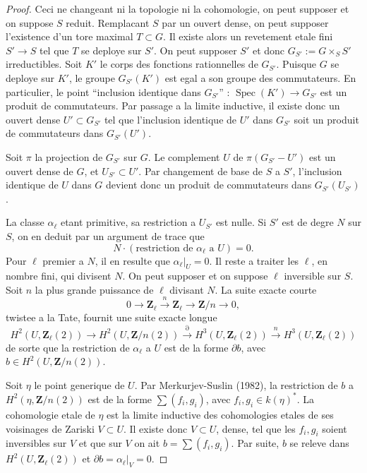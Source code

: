 \documentclass[11pt,a4paper]{article}
\theoremstyle{plain}
\theoremstyle{definition}
\DeclareMathOperator{\Spec}{Spec}
\begin{document}
\begin{proof}
Ceci ne changeant ni la topologie ni la cohomologie, on peut supposer et on suppose $S$ reduit. Remplacant $S$ par un ouvert dense, on peut supposer l'existence d'un tore maximal $T \subset G$. Il existe alors un revetement etale fini $S' \to S$ tel que $T$ se deploye sur $S'$. On peut supposer $S'$ et donc $G_{S'} := G \times_S S'$ irreductibles. Soit $K'$ le corps des fonctions rationnelles de $G_{S'}$. Puisque $G$ se deploye sur $K'$, le groupe $G_{S'}(K')$ est egal a son groupe des commutateurs. En particulier, le point ``inclusion identique dans $G_{S'}$'' : $\Spec(K') \to G_{S'}$ est un produit de commutateurs. Par passage a la limite inductive, il existe donc un ouvert dense $U' \subset G_{S'}$ tel que l'inclusion identique de $U'$ dans $G_{S'}$ soit un produit de commutateurs dans $G_{S'}(U')$.

Soit $\pi$ la projection de $G_{S'}$ sur $G$. Le complement $U$ de $\pi(G_{S'} - U')$ est un ouvert dense de $G$, et $U_{S'} \subset U'$. Par changement de base de $S$ a $S'$, l'inclusion identique de $U$ dans $G$ devient donc un produit de commutateurs dans $G_{S'}(U_{S'})$.

La classe $\alpha_\ell$ etant primitive, sa restriction a $U_{S'}$ est nulle. Si $S'$ est de degre $N$ sur $S$, on en deduit par un argument de trace que
\[
N \cdot (\text{restriction de } \alpha_\ell \text{ a } U) = 0.
\]
Pour $\ell$ premier a $N$, il en resulte que $\alpha_\ell|_U = 0$. Il reste a traiter les $\ell$, en nombre fini, qui divisent $N$. On peut supposer et on suppose $\ell$ inversible sur $S$. Soit $n$ la plus grande puissance de $\ell$ divisant $N$. La suite exacte courte
\[
0 \to \mathbf{Z}_\ell \xrightarrow{n} \mathbf{Z}_\ell \to \mathbf{Z}/n \to 0,
\]
twistee a la Tate, fournit une suite exacte longue
\[
H^2(U, \mathbf{Z}_\ell(2)) \to H^2(U, \mathbf{Z}/n(2)) \xrightarrow{\partial} H^3(U, \mathbf{Z}_\ell(2)) \xrightarrow{n} H^3(U, \mathbf{Z}_\ell(2))
\]
de sorte que la restriction de $\alpha_\ell$ a $U$ est de la forme $\partial b$, avec $b \in H^2(U, \mathbf{Z}/n(2))$.

Soit $\eta$ le point generique de $U$. Par Merkurjev-Suslin (1982), la restriction de $b$ a $H^2(\eta, \mathbf{Z}/n(2))$ est de la forme $\sum (f_i, g_i)$, avec $f_i, g_i \in k(\eta)^*$. La cohomologie etale de $\eta$ est la limite inductive des cohomologies etales de ses voisinages de Zariski $V \subset U$. Il existe donc $V \subset U$, dense, tel que les $f_i, g_i$ soient inversibles sur $V$ et que sur $V$ on ait $b = \sum (f_i, g_i)$. Par suite, $b$ se releve dans $H^2(U, \mathbf{Z}_\ell(2))$ et $\partial b = \alpha_\ell|_V = 0$.
\end{proof}
\end{document}
